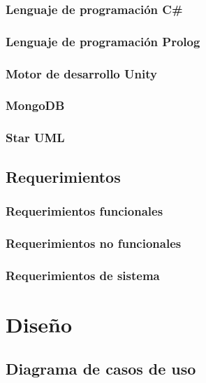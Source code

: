\documentclass[12pt,twoside]{article}
\begin{document}
	\subsubsection{Lenguaje de programación C\#}
	
	\subsubsection{Lenguaje de programación Prolog}
	
	\subsubsection{Motor de desarrollo Unity}
	
	\subsubsection{MongoDB}
	
	\subsubsection{Star UML}
	
	\subsection{Requerimientos}
	
	\subsubsection{Requerimientos funcionales}
	
	\subsubsection{Requerimientos no funcionales}
	
	\subsubsection{Requerimientos de sistema}

	\section{Diseño}
	
	\subsection{Diagrama de casos de uso}
	
\end{document}
